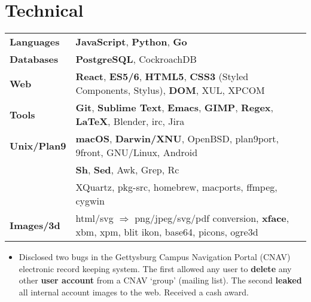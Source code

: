 \documentclass[11pt]{article}
\begin{document}
\section*{Technical}
\begin{tabular}{ l l }
  	\textbf{Languages} & \textbf{JavaScript}, \textbf{Python}, \textbf{Go} \\

  	\textbf{Databases} & \textbf{PostgreSQL}, CockroachDB \\
  	
  	\textbf{Web} & \textbf{React}, \textbf{ES5/6}, \textbf{HTML5}, \textbf{CSS3} (Styled Components, Stylus), \textbf{DOM}, XUL, XPCOM \\
  	
  	\textbf{Tools} & \textbf{Git},  \textbf{Sublime Text}, \textbf{Emacs}, \textbf{GIMP}, \textbf{Regex}, \textbf{\LaTeX}, Blender, irc, Jira \\
  	
  	\textbf{Unix/Plan9} & \textbf{macOS}, \textbf{Darwin/XNU}, OpenBSD, plan9port, 9front, GNU/Linux, Android \\
  	& \textbf{Sh}, \textbf{Sed}, Awk, Grep, Rc \\
  	& XQuartz, pkg-src, homebrew, macports, ffmpeg, cygwin \\
  	\textbf{Images/3d} & html/svg $\Rightarrow$ png/jpeg/svg/pdf conversion, \textbf{xface}, xbm, xpm, blit ikon, base64, picons, ogre3d \\
\end{tabular}
\begin{itemize}
	\item Disclosed two bugs in the Gettysburg Campus Navigation Portal (CNAV) electronic record keeping system. The first allowed any user to \textbf{delete} any other \textbf{user account} from a CNAV `group' (mailing list). The second \textbf{leaked} all internal account images to the web. Received a cash award.
\end{itemize}
\end{document}
